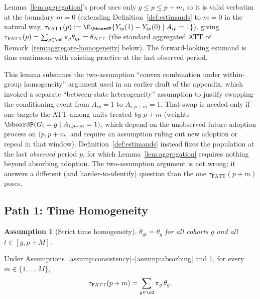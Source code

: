 \documentclass{article}
\renewcommand{\P}{\bboardP}
\newtheorem{assumption}{Assumption}
\begin{document}
\begin{remark}[Boundary case $m=0$]
\label{rem:m0}
Lemma~\ref{lem:aggregation}'s proof uses only $g\leq p\leq p+m$, so it is valid verbatim at the boundary $m=0$ (extending Definition~\ref{def:estimands} to $m=0$ in the natural way, $\tau_{\mathrm{FATT}}(p) := \E_\P\{Y_{ip}(1)-Y_{ip}(0)\mid A_{ip}=1\}$), giving $\tau_{\mathrm{FATT}}(p)=\sum_{g\in\cG}\pi_g\theta_{gp}=\theta_{\mathrm{ATT}}$ (the standard aggregated ATT of Remark~\ref{rem:aggregate-homogeneity} below). The forward-looking estimand is thus continuous with existing practice at the last observed period.
\end{remark}

\begin{remark}
\label{rem:old-lemma}
This lemma subsumes the two-assumption ``convex combination under within-group homogeneity'' argument used in an earlier draft of the appendix, which invoked a separate ``between-state heterogeneity'' assumption to justify swapping the conditioning event from $A_{ip}=1$ to $A_{i,p+m}=1$. That swap is needed only if one targets the ATT among units treated \emph{by $p+m$} (weights $\P(G_i=g\mid A_{i,p+m}=1)$, which depend on the unobserved future adoption process on $(p, p+m]$ and require an assumption ruling out new adoption or repeal in that window). Definition~\ref{def:estimands} instead fixes the population at the last \emph{observed} period $p$, for which Lemma~\ref{lem:aggregation} requires nothing beyond absorbing adoption. The two-assumption argument is not wrong; it answers a different (and harder-to-identify) question than the one $\tau_{\mathrm{FATT}}(p+m)$ poses.
\end{remark}

\subsection{Path 1: Time Homogeneity}

\begin{assumption}[Strict time homogeneity]
\label{assump:strict-homogeneity}
$\theta_{gt} = \theta_g$ for all cohorts $g$ and all $t \in [g, p+M]$.
\end{assumption}

\begin{proposition}
\label{prop:path1}
Under Assumptions~\ref{assump:consistency}--\ref{assump:absorbing} and \ref{assump:strict-homogeneity}, for every $m \in \{1,\ldots,M\}$,
\[
\tau_{\mathrm{FATT}}(p+m) = \sum_{g \in \cG} \pi_g\, \theta_g.
\]
\end{proposition}
\end{document}
